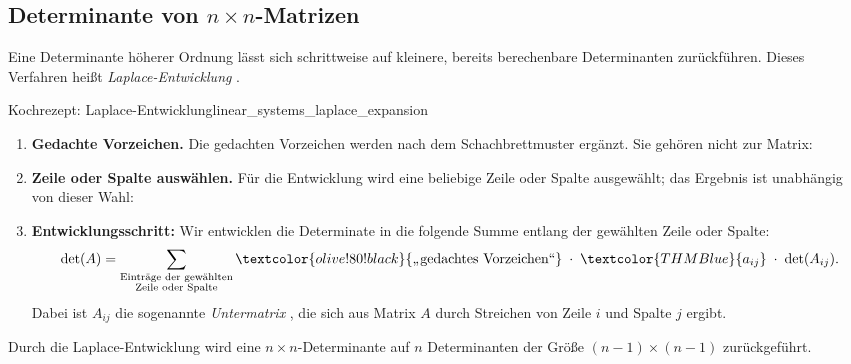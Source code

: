 \subsection{Determinante von $n\times n$-Matrizen}
\label{subsec:linear_systems_laplace_expansion}

Eine Determinante höherer Ordnung lässt sich schrittweise auf kleinere,
bereits berechenbare Determinanten zurückführen. Dieses Verfahren heißt
\emph{Laplace-Entwicklung} .

\begin{TheoremBox}{Kochrezept: Laplace-Entwicklung}{linear_systems_laplace_expansion}
\begin{enumerate}[label=\textbf{Schritt \arabic*:},leftmargin=*,itemsep=0.15em]
  \item \textbf{Gedachte Vorzeichen.}
    Die gedachten Vorzeichen werden nach dem Schachbrettmuster ergänzt.
    Sie gehören nicht zur Matrix:
    \begin{center}
      \vspace{-0.35\baselineskip}
      \vspace{-0.35\baselineskip}
    \end{center}
  \item \textbf{Zeile oder Spalte auswählen.}
    Für die Entwicklung wird eine beliebige Zeile oder Spalte ausgewählt;
    das Ergebnis ist unabhängig von dieser Wahl:

    \begin{center}
      \vspace{-0.2\baselineskip}
      \vspace{-0.2\baselineskip}
    \end{center}
  \item \textbf{Entwicklungsschritt:}
    Wir entwicklen die Determinate in die folgende Summe entlang der gewählten Zeile oder Spalte:
    \[
      \det(A)
      =\sum_{\substack{\text{Einträge der gewählten}\\
                       \text{Zeile oder Spalte}}}
       \textcolor{olive!80!black}{\text{„gedachtes Vorzeichen“}}
       \;\cdot\;\textcolor{THMBlue}{a_{ij}}
       \;\cdot\;\det(A_{ij}).
    \]
    Dabei ist $A_{ij}$ die sogenannte \emph{Untermatrix} , die
    sich aus Matrix $A$ durch Streichen von Zeile $i$ und Spalte $j$ ergibt.

    \begin{center}
      \vspace{-0.25\baselineskip}
      \vspace{-0.25\baselineskip}
    \end{center}

\end{enumerate}
Durch die Laplace-Entwicklung wird eine $n\times n$-Determinante auf $n$
Determinanten der Größe $(n-1)\times(n-1)$ zurückgeführt.
\end{TheoremBox}

